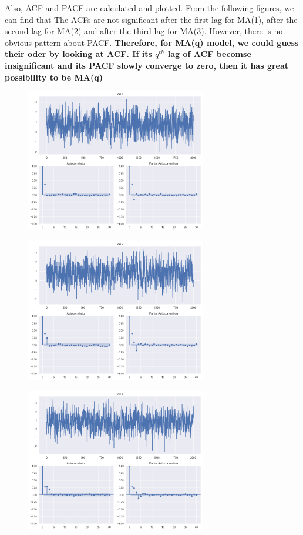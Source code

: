 \documentclass[11pt,en]{elegantpaper}
\begin{document}
Also, ACF and PACF are calculated and plotted. From the following figures, we can find that
The ACFs are not significant after the first lag for MA(1), after the second lag for 
MA(2) and after the third lag for MA(3). However, there is no obvious pattern about PACF.
\textbf{Therefore, for MA(q) model, we could guess their oder by looking at ACF. If its $q^{th}$ lag
of ACF becomse insignificant and its PACF slowly converge to zero, then it has great possibility to be MA(q)
}
\begin{figure}[htbp] 
    \centering 
    \includegraphics[width=0.7\textwidth]{./image/MA1} 
\end{figure}

\begin{figure}[htbp] 
    \centering 
    \includegraphics[width=0.7\textwidth]{./image/MA2} 
\end{figure}
\begin{figure}[htbp] 
    \centering 
    \includegraphics[width=0.7\textwidth]{./image/MA3} 
\end{figure}
\end{document}
